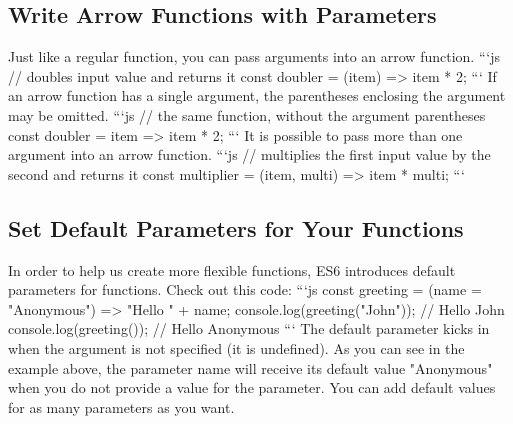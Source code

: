 \documentclass{article}%
\begin{document}
\subsection{Write Arrow Functions with Parameters}%
\label{subsec:WriteArrowFunctionswithParameters}%
Just like a regular function, you can pass arguments into an arrow function.\newline%
```js\newline%
// doubles input value and returns it\newline%
const doubler = (item) => item * 2;\newline%
```\newline%
If an arrow function has a single argument, the parentheses enclosing the argument may be omitted.\newline%
```js\newline%
// the same function, without the argument parentheses\newline%
const doubler = item => item * 2;\newline%
```\newline%
It is possible to pass more than one argument into an arrow function.\newline%
```js\newline%
// multiplies the first input value by the second and returns it\newline%
const multiplier = (item, multi) => item * multi;\newline%
```\newline%

%
\subsection{Set Default Parameters for Your Functions}%
\label{subsec:SetDefaultParametersforYourFunctions}%
In order to help us create more flexible functions, ES6 introduces default parameters for functions.\newline%
Check out this code:\newline%
```js\newline%
const greeting = (name = "Anonymous") => "Hello " + name;\newline%
console.log(greeting("John")); // Hello John\newline%
console.log(greeting()); // Hello Anonymous\newline%
```\newline%
The default parameter kicks in when the argument is not specified (it is undefined). As you can see in the example above, the parameter name will receive its default value "Anonymous" when you do not provide a value for the parameter. You can add default values for as many parameters as you want.\newline%
\end{document}
